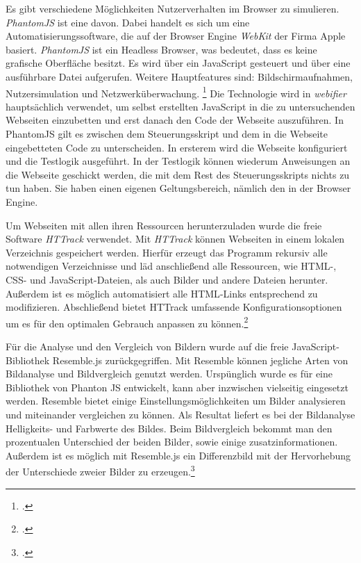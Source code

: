 \label{par:phantomjs}
Es gibt verschiedene Möglichkeiten Nutzerverhalten im Browser zu simulieren.
\textit{PhantomJS} ist eine davon.
Dabei handelt es sich um eine Automatisierungssoftware, die auf der Browser Engine \textit{WebKit} der Firma Apple basiert.
\textit{PhantomJS} ist ein Headless Browser, was bedeutet, dass es keine grafische Oberfläche besitzt.
Es wird über ein JavaScript gesteuert und über eine ausführbare Datei aufgerufen.
Weitere Hauptfeatures sind: Bildschirmaufnahmen, Nutzersimulation und Netzwerküberwachung.
\footcite[Vgl.][]{phantomjs}
Die Technologie wird in \textit{webifier} hauptsächlich verwendet, um selbst erstellten JavaScript in die zu untersuchenden Webseiten einzubetten und erst danach den Code der Webseite auszuführen.
In PhantomJS gilt es zwischen dem Steuerungsskript und dem in die Webseite eingebetteten Code zu unterscheiden.
In ersterem wird die Webseite konfiguriert und die Testlogik ausgeführt.
In der Testlogik können wiederum Anweisungen an die Webseite geschickt werden, die mit dem Rest des Steuerungsskripts nichts zu tun haben. Sie haben einen eigenen Geltungsbereich, nämlich den in der Browser Engine.

Um Webseiten mit allen ihren Ressourcen herunterzuladen wurde die freie Software \textit{HTTrack} verwendet. Mit \textit{HTTrack} können Webseiten in einem lokalen Verzeichnis gespeichert werden. Hierfür erzeugt das Programm rekursiv alle notwendigen Verzeichnisse und läd anschließend alle Ressourcen, wie \ac{HTML}-, \ac{CSS}- und JavaScript-Dateien, als auch Bilder und andere Dateien herunter. Außerdem ist es möglich automatisiert alle \ac{HTML}-Links entsprechend zu modifizieren. Abschließend bietet HTTrack umfassende Konfigurationsoptionen um es für den optimalen Gebrauch anpassen zu können.\footcite[Vgl.][]{httrack}

Für die Analyse und den Vergleich von Bildern wurde auf die freie JavaScript-Bibliothek Resemble.js zurückgegriffen. Mit Resemble können jegliche Arten von Bildanalyse und Bildvergleich genutzt werden. Urspünglich wurde es für eine Bibliothek von Phanton JS entwickelt, kann aber inzwischen vielseitig eingesetzt werden. Resemble bietet einige Einstellungsmöglichkeiten um Bilder analysieren und miteinander vergleichen zu können. Als Resultat liefert es bei der Bildanalyse Helligkeits- und Farbwerte des Bildes. Beim Bildvergleich bekommt man den prozentualen Unterschied der beiden Bilder, sowie einige zusatzinformationen. Außerdem ist es möglich mit Resemble.js ein Differenzbild mit der Hervorhebung der Unterschiede zweier Bilder zu erzeugen.\footcite[Vgl.][]{resemblejs}

